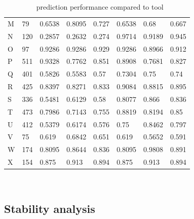 \documentclass[11pt]{article} %
\begin{document}
\begin{table}[H]
{\begin{adjustbox}{max width=\textwidth,max totalheight=\textheight,keepaspectratio}
\begin{tabular}{llllHllH}
				M     & 79     & 0.6538      & 0.8095 & 0.727              & 0.6538      & 0.68   & 0.667              \\
				N     & 120    & 0.2857      & 0.2632 & 0.274              & 0.9714      & 0.9189 & 0.945              \\
				O     & 97     & 0.9286      & 0.9286 & 0.929              & 0.9286      & 0.8966 & 0.912              \\
				P     & 511    & 0.9328      & 0.7762 & 0.851              & 0.8908      & 0.7681 & 0.827              \\
				Q     & 401    & 0.5826      & 0.5583 & 0.57               & 0.7304      & 0.75   & 0.74               \\
				R     & 425    & 0.8397      & 0.8271 & 0.833              & 0.9084      & 0.8815 & 0.895              \\
				S     & 336    & 0.5481      & 0.6129 & 0.58               & 0.8077      & 0.866  & 0.836              \\
				T     & 473    & 0.7986      & 0.7143 & 0.755              & 0.8819      & 0.8194 & 0.85               \\
				U     & 412    & 0.5379      & 0.6174 & 0.576              & 0.75        & 0.8462 & 0.797              \\
				V     & 75     & 0.619       & 0.6842 & 0.651              & 0.619       & 0.5652 & 0.591              \\
				W     & 174    & 0.8095      & 0.8644 & 0.836              & 0.8095      & 0.9808 & 0.891              \\
				X     & 154    & 0.875       & 0.913  & 0.894              & 0.875       & 0.913  & 0.894              \\ \bottomrule
			\end{tabular}
		\end{adjustbox}\\}
\caption{\OurTool~ prediction performance compared to  tool}
\end{table}

\subsection*{Stability analysis}
\end{document}
